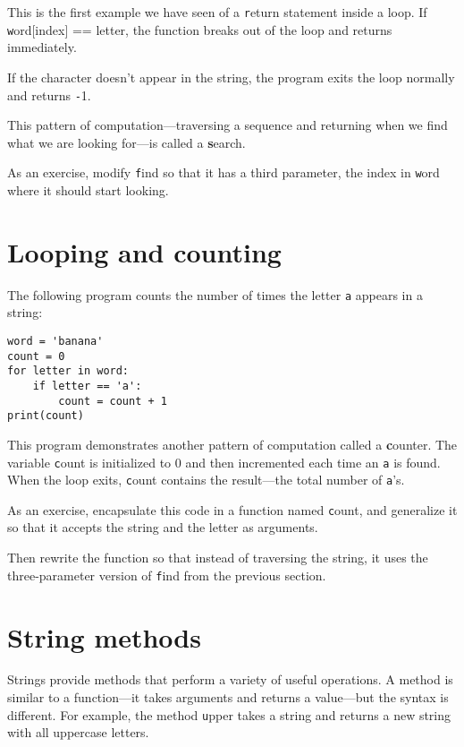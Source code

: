 \documentclass[
DIV=11,
fontsize=12,
twoside,
headinclude=false,
titlepage=firstiscover,
abstract=true,
headsepline=true,
footsepline=true,
chapterprefix=true, %
headings=big,
bibliography=totoc,%
captions=tableheading
]{scrbook}
\theoremstyle{definition}
\begin{document}
This is the first example we have seen of a {\texttt return} statement
inside a loop.  If {\texttt word[index] == letter}, the function breaks
out of the loop and returns immediately.

If the character doesn't appear in the string, the program
exits the loop normally and  returns {\texttt -1}.

This pattern of computation---traversing a sequence and returning
when we find what we are looking for---is called a {\textbf search}.

As an exercise, modify {\texttt find} so that it has a
third parameter, the index in {\texttt word} where it should start
looking.


\section{Looping and counting}
\label{counter}

The following program counts the number of times the letter {\texttt a}
appears in a string:

\begin{lstlisting}
word = 'banana'
count = 0
for letter in word:
    if letter == 'a':
        count = count + 1
print(count)
\end{lstlisting}
%
This program demonstrates another pattern of computation called a {\textbf
counter}.  The variable {\texttt count} is initialized to 0 and then
incremented each time an {\texttt a} is found.
When the loop exits, {\texttt count}
contains the result---the total number of {\texttt a}'s.

As an exercise, encapsulate this code in a function named {\texttt
count}, and generalize it so that it accepts the string and the
letter as arguments.

Then rewrite the function so that instead of
traversing the string, it uses the three-parameter version of {\texttt
find} from the previous section.


\section{String methods}
\label{optional}

Strings provide methods that perform a variety of useful operations.
A method is similar to a function---it takes arguments and
returns a value---but the syntax is different.  For example, the
method {\texttt upper} takes a string and returns a new string with
all uppercase letters.
\end{document}

